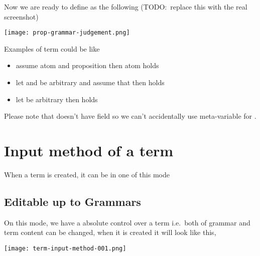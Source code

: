 \documentclass[master.tex]{subfiles}
\begin{document}
Now we are ready to define  as the following (TODO:\ replace
this with the real screenshot)

\centerline{\texttt{[image: prop-grammar-judgement.png]}}

\newcommand{\propTurnstile}{\pifmt{$\vdash$}}

Examples of  term could be like
\begin{itemize}
  \item \bat{\bat{\bat{\propEmptyContext\pifmt{,}\bat{\pvar{p}}}\pifmt{,}\bat{\bat{\pvar{p}}\propImp\bat{\pvar{q}}}}\propTurnstile\bat{\pvar{q}}}

  assume atom  and proposition  then atom  holds

  \item \bat{\bat{\propEmptyContext\pifmt{,}\bat{\pvar{B}\propAnd\pvar{A}}}\propTurnstile\bat{\pvar{A}\propAnd\pvar{B}}}

  let  and  be arbitrary  and assume that
       then 
      holds

  \item \bat{\propEmptyContext\propTurnstile\bat{\pvar{A}\propOr\bat{\propNot\pvar{A}}}}

  let  be arbitrary  then
   holds

\end{itemize}

Please note that  doesn't have field \kVarRegex so we can't
accidentally use meta-variable for .

\section{Input method of a term}

When a term is created, it can be in one of this mode

\subsection{Editable up to Grammars}
On this mode, we have a absolute control over a term i.e.\ both of grammar and
term content can be changed, when it is created it will look like this,

\centerline{\texttt{[image: term-input-method-001.png]}}
\end{document}
